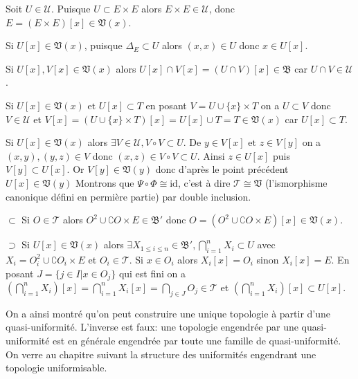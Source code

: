 \documentclass[a4paper, 11pt, french]{book}
\newenvironment{itemise}{\itemize}{\enditemize}
\theoremstyle{plain} %
\theoremstyle{definition} %
\theoremstyle{remark} %
\newcommand{\1}{\mathds{1}}
\newcommand{\id}{\mathrm{id}}
\newcommand{\infegal}{\leqslant}
\newcommand\et{\text{ et }}
\begin{document}
\begin{itemise}
	\item Soit $U\in\mathscr{U}$.
	Puisque $U\subset E\times E$ alors $E\times E\in\mathscr{U}$, donc $E=(E\times E)[x]\in\mathfrak{V}(x)$.
	\item Si $U[x]\in\mathfrak{V}(x)$, puisque $\Delta_E\subset U$ alors $(x, x)\in U$ donc $x\in U[x]$.
	\item Si $U[x], V[x]\in\mathfrak{V}(x)$ alors $U[x]\cap V[x]=(U\cap V)[x]\in\mathfrak{B}$ car $U\cap V\in\mathscr{U}$.
	\item Si $U[x]\in\mathfrak{V}(x)\et U[x]\subset T$ en posant $V=U\cup\{x\}\times T$ on a $U\subset V$ donc $V\in\mathscr{U}$ et $V[x]=(U\cup\{x\}\times T)[x]=U[x]\cup T=T\in\mathfrak{V}(x)$ car $U[x]\subset T$.
	\item Si $U[x]\in\mathfrak{V}(x)$ alors $\exists V\in\mathscr{U}, V\circ V\subset U$.
	De $y\in V[x]\et z\in V[y]$ on a $(x, y), (y, z)\in V$ donc $(x, z)\in V\circ V\subset U$.
	Ainsi $z\in U[x]$ puis $V[y]\subset U[x]$.
	Or $V[y]\in\mathfrak{V}(y)$ donc d'après le point précédent $U[x]\in\mathfrak{V}(y)$
\end{itemise}
Montrons que $\Psi\circ\Phi\cong\id$, c'est à dire $\mathscr{T}\cong\mathfrak{V}$ (l'ismorphisme canonique défini en permière partie) par double inclusion.
\begin{itemise}
	\item[$\subset$] Si $O\in\mathscr{T}$ alors $O^2\cup\complement O\times E\in\mathfrak{B}'$ donc $O=(O^2\cup\complement O\times E)[x]\in\mathfrak{V}(x)$.
	\item[$\supset$] Si $U[x]\in\mathfrak{V}(x)$ alors $\exists X_{1\infegal i\infegal n}\in\mathfrak{B}', \bigcap_{i=1}^nX_i\subset U$ avec $X_i=O_i^2\cup\complement O_i\times E$ et $O_i\in\mathscr{T}$.
	Si $x\in O_i$ alors $X_i[x]=O_i$ sinon $X_i[x]=E$.
	En posant $J=\{j\in I|x\in O_j\}$ qui est fini on a $(\bigcap_{i=1}^nX_i)[x]=\bigcap_{i=1}^nX_i[x]=\bigcap_{j\in J}O_j\in\mathscr{T}$ et $(\bigcap_{i=1}^nX_i)[x]\subset U[x]$.
\end{itemise}

\remarque
On a ainsi montré qu'on peut construire une unique topologie à partir d'une quasi-uniformité.
L'inverse est faux: une topologie engendrée par une quasi-uniformité est en générale engendrée par toute une famille de quasi-uniformité.
On verre au chapitre suivant la structure des uniformités engendrant une topologie uniformisable.
\end{document}
